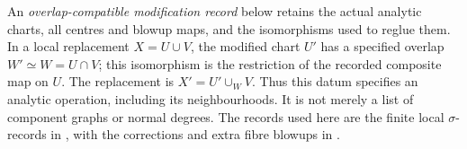 
An \emph{overlap-compatible modification record} below retains the
actual analytic charts, all centres and blowup maps, and the
isomorphisms used to reglue them. In a local replacement
$X=U\cup V$, the modified chart $U'$ has a specified overlap
$W'\simeq W=U\cap V$; this isomorphism is the restriction of
the recorded composite map on $U$. The replacement is
$X'=U'\cup_W V$. Thus this datum specifies an analytic
operation, including its neighbourhoods. It is not merely a
list of component graphs or normal degrees. The records used
here are the finite local $\sigma$-records in
\cite[\S\S4.2--4.14]{Kulikov1977}, with the corrections and
extra fibre blowups in \cite[\S\S8--11]{Kulikov1981}.

